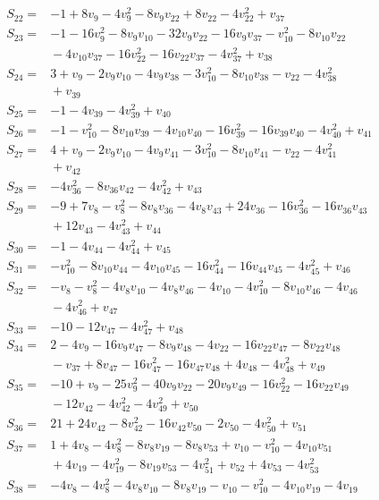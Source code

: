 \begin{align*}
S_{22}={}&-1+8v_{9}-4v_{9}^{2}-8v_{9}v_{22}+8v_{22}-4v_{22}^{2}+v_{37}\\
S_{23}={}&-1-16v_{9}^{2}-8v_{9}v_{10}-32v_{9}v_{22}-16v_{9}v_{37}-v_{10}^{2}-8v_{10}v_{22}\\
&{}-4v_{10}v_{37}-16v_{22}^{2}-16v_{22}v_{37}-4v_{37}^{2}+v_{38}\\
S_{24}={}&3+v_{9}-2v_{9}v_{10}-4v_{9}v_{38}-3v_{10}^{2}-8v_{10}v_{38}-v_{22}-4v_{38}^{2}\\
&{}+v_{39}\\
S_{25}={}&-1-4v_{39}-4v_{39}^{2}+v_{40}\\
S_{26}={}&-1-v_{10}^{2}-8v_{10}v_{39}-4v_{10}v_{40}-16v_{39}^{2}-16v_{39}v_{40}-4v_{40}^{2}+v_{41}\\
S_{27}={}&4+v_{9}-2v_{9}v_{10}-4v_{9}v_{41}-3v_{10}^{2}-8v_{10}v_{41}-v_{22}-4v_{41}^{2}\\
&{}+v_{42}\\
S_{28}={}&-4v_{36}^{2}-8v_{36}v_{42}-4v_{42}^{2}+v_{43}\\
S_{29}={}&-9+7v_{8}-v_{8}^{2}-8v_{8}v_{36}-4v_{8}v_{43}+24v_{36}-16v_{36}^{2}-16v_{36}v_{43}\\
&{}+12v_{43}-4v_{43}^{2}+v_{44}\\
S_{30}={}&-1-4v_{44}-4v_{44}^{2}+v_{45}\\
S_{31}={}&-v_{10}^{2}-8v_{10}v_{44}-4v_{10}v_{45}-16v_{44}^{2}-16v_{44}v_{45}-4v_{45}^{2}+v_{46}\\
S_{32}={}&-v_{8}-v_{8}^{2}-4v_{8}v_{10}-4v_{8}v_{46}-4v_{10}-4v_{10}^{2}-8v_{10}v_{46}-4v_{46}\\
&{}-4v_{46}^{2}+v_{47}\\
S_{33}={}&-10-12v_{47}-4v_{47}^{2}+v_{48}\\
S_{34}={}&2-4v_{9}-16v_{9}v_{47}-8v_{9}v_{48}-4v_{22}-16v_{22}v_{47}-8v_{22}v_{48}\\
&{}-v_{37}+8v_{47}-16v_{47}^{2}-16v_{47}v_{48}+4v_{48}-4v_{48}^{2}+v_{49}\\
S_{35}={}&-10+v_{9}-25v_{9}^{2}-40v_{9}v_{22}-20v_{9}v_{49}-16v_{22}^{2}-16v_{22}v_{49}\\
&{}-12v_{42}-4v_{42}^{2}-4v_{49}^{2}+v_{50}\\
S_{36}={}&21+24v_{42}-8v_{42}^{2}-16v_{42}v_{50}-2v_{50}-4v_{50}^{2}+v_{51}\\
S_{37}={}&1+4v_{8}-4v_{8}^{2}-8v_{8}v_{19}-8v_{8}v_{53}+v_{10}-v_{10}^{2}-4v_{10}v_{51}\\
&{}+4v_{19}-4v_{19}^{2}-8v_{19}v_{53}-4v_{51}^{2}+v_{52}+4v_{53}-4v_{53}^{2}\\
S_{38}={}&-4v_{8}-4v_{8}^{2}-4v_{8}v_{10}-8v_{8}v_{19}-v_{10}-v_{10}^{2}-4v_{10}v_{19}-4v_{19}\\

\end{align*}
